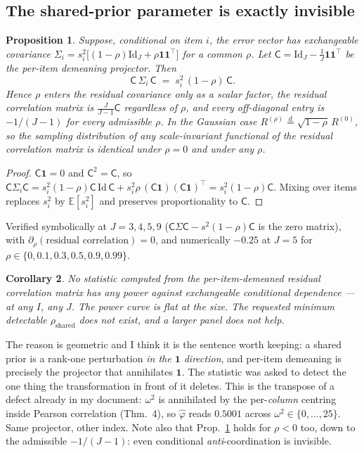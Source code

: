 \documentclass[11pt]{article}
\newtheorem{proposition}{Proposition}
\newtheorem{corollary}[proposition]{Corollary}
\theoremstyle{definition}
\newcommand{\Cc}{\mathsf{C}}
\begin{document}
\subsection{The shared-prior parameter is exactly invisible}

\begin{proposition}\label{prop:dead}
Suppose, conditional on item $i$, the error vector has exchangeable covariance
$\Sigma_i=s_i^2\bigl[(1-\rho)\mathrm{Id}_J+\rho\mathbf 1\mathbf 1^{\top}\bigr]$ for a
common $\rho$. Let $\Cc=\mathrm{Id}_J-\tfrac1J\mathbf 1\mathbf 1^{\top}$ be the
per-item demeaning projector. Then
\[
  \Cc\,\Sigma_i\,\Cc \;=\; s_i^2\,(1-\rho)\,\Cc .
\]
Hence $\rho$ enters the residual covariance \emph{only as a scalar factor}, the
residual \emph{correlation} matrix is $\tfrac{J}{J-1}\Cc$ regardless of $\rho$, and
every off-diagonal entry is $-1/(J-1)$ for every admissible $\rho$. In the Gaussian
case $R^{(\rho)}\overset{d}{=}\sqrt{1-\rho}\,R^{(0)}$, so the sampling distribution
of \emph{any} scale-invariant functional of the residual correlation matrix is
\emph{identical} under $\rho=0$ and under any $\rho$.
\end{proposition}

\begin{proof}
$\Cc\mathbf 1=0$ and $\Cc^2=\Cc$, so $\Cc\Sigma_i\Cc=s_i^2(1-\rho)\Cc\,\mathrm{Id}\,\Cc
+s_i^2\rho\,(\Cc\mathbf 1)(\Cc\mathbf 1)^{\top}=s_i^2(1-\rho)\Cc$. Mixing over
items replaces $s_i^2$ by $\mathbb E[s_i^2]$ and preserves proportionality to $\Cc$.
\end{proof}

\noindent Verified symbolically at $J=3,4,5,9$ ($\Cc\Sigma\Cc-s^2(1-\rho)\Cc$ is the
zero matrix), with $\partial_\rho(\text{residual correlation})=0$, and numerically
$-0.25$ at $J=5$ for $\rho\in\{0,0.1,0.3,0.5,0.9,0.99\}$.

\begin{corollary}
No statistic computed from the per-item-demeaned residual correlation matrix has any
power against exchangeable conditional dependence --- at any $I$, any $J$. The power
curve is flat at the size. The requested minimum detectable
$\rho_{\mathrm{shared}}$ does not exist, and a larger panel does not help.
\end{corollary}

\noindent The reason is geometric and I think it is the sentence worth keeping: a
shared prior is a rank-one perturbation \emph{in the $\mathbf 1$ direction}, and
per-item demeaning is precisely the projector that annihilates $\mathbf 1$. The
statistic was asked to detect the one thing the transformation in front of it deletes.
This is the transpose of a defect already in my document: $\omega^2$ is annihilated by
the per-\emph{column} centring inside Pearson correlation (Thm.~4), so $\hat\varphi$
reads $0.5001$ across $\omega^2\in\{0,\dots,25\}$. Same projector, other index. Note
also that Prop.~\ref{prop:dead} holds for $\rho<0$ too, down to the admissible
$-1/(J-1)$: even conditional \emph{anti}-coordination is invisible.
\end{document}
